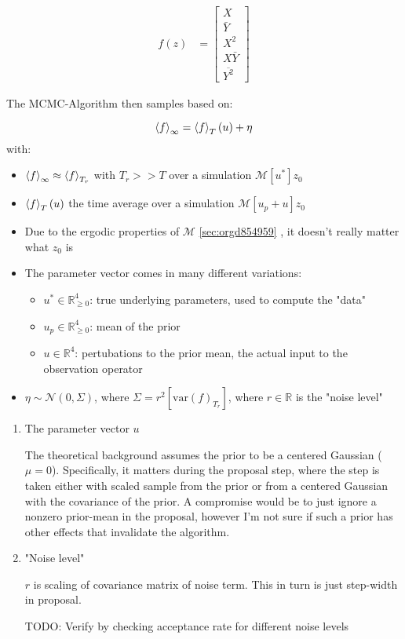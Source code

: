 \documentclass[11pt]{article}
\newcommand{\R}{{\mathbb{R}}}
\newcommand{\N}[2]{\mathcal{N}\left(#1,#2\right)}
\begin{document}
\begin{align}
  f(z) &=
  \begin{bmatrix}
    X \\
    \bar{Y} \\
    X^2 \\
    X \bar{Y} \\
    \overline{Y^2}
  \end{bmatrix}
\end{align}

The MCMC-Algorithm then samples based on:

$$\expval{f}_\infty = \expval{f}_T(u) + \eta$$
with:
\begin{itemize}
\item \(\expval{f}_\infty \approx \expval{f}_{T_r}\) with \(T_r >> T\) over a simulation \(\mathcal{M}[u^*] z_0\)
\item \(\expval{f}_T(u)\) the time average over a simulation \(\mathcal{M}[u_p + u] z_0\)
\item Due to the ergodic properties of \(\mathcal{M}\) \ref{sec:orgd854959} , it doesn't really matter what \(z_0\) is
\item The parameter vector comes in many different variations:
\begin{itemize}
\item \(u^* \in \R^4_{\geq 0}\): true underlying parameters, used to compute the "data"
\item \(u_p \in \R^4_{\geq 0}\): mean of the prior
\item \(u \in \R^4\): pertubations to the prior mean, the actual input to the observation operator
\end{itemize}
\item \(\eta \sim \N{0}{\Sigma}\), where \(\Sigma = r^2 [\text{var}(f)_{T_r}]\),
where \(r \in \R\) is the "noise level"
\end{itemize}

\begin{enumerate}
\item The parameter vector \(u\)
\label{sec:org9337f2e}

The theoretical background assumes the prior to be a centered Gaussian (\(\mu = 0\)).
Specifically, it matters during the proposal step, where the step is taken either with
scaled sample from the prior or from a centered Gaussian with the covariance of the prior.
A compromise would be to just ignore a nonzero prior-mean in the proposal, however I'm not
sure if such a prior has other effects that invalidate the algorithm.

\item "Noise level"
\label{sec:org77cff58}

\(r\) is scaling of covariance matrix of noise term. This in turn is just step-width in proposal.

TODO: Verify by checking acceptance rate for different noise levels
\end{enumerate}
\end{document}
